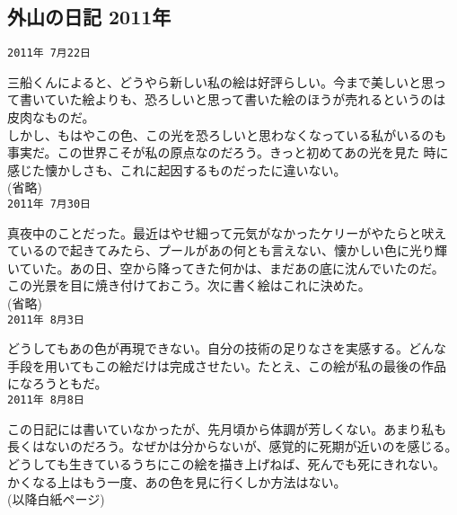 \documentclass[a4paper,8pt,min]{jsarticle}
\begin{document}
\subsection{外山の日記 2011年} 
\begin{screen}
 \tt{2011年 7月22日}

 三船くんによると、どうやら新しい私の絵は好評らしい。今まで美しいと思っ
 て書いていた絵よりも、恐ろしいと思って書いた絵のほうが売れるというのは
 皮肉なものだ。\\
 しかし、もはやこの色、この光を恐ろしいと思わなくなっている私がいるのも
 事実だ。この世界こそが私の原点なのだろう。きっと初めてあの光を見た
 時に感じた懐かしさも、これに起因するものだったに違いない。\\

 (省略)\\

 \tt{2011年 7月30日}

 真夜中のことだった。最近はやせ細って元気がなかったケリーがやたらと吠え
 ているので起きてみたら、プールがあの何とも言えない、懐かしい色に光り輝
 いていた。あの日、空から降ってきた何かは、まだあの底に沈んでいたのだ。\\
 この光景を目に焼き付けておこう。次に書く絵はこれに決めた。\\

 (省略)\\

 \tt{2011年 8月3日}

 どうしてもあの色が再現できない。自分の技術の足りなさを実感する。どんな
 手段を用いてもこの絵だけは完成させたい。たとえ、この絵が私の最後の作品
 になろうともだ。\\

 \tt{2011年 8月8日}

 この日記には書いていなかったが、先月頃から体調が芳しくない。あまり私も
 長くはないのだろう。なぜかは分からないが、感覚的に死期が近いのを感じる。
 \\
 どうしても生きているうちにこの絵を描き上げねば、死んでも死にきれない。
 かくなる上はもう一度、あの色を見に行くしか方法はない。\\

 (以降白紙ページ)

\end{screen}
\end{document}
